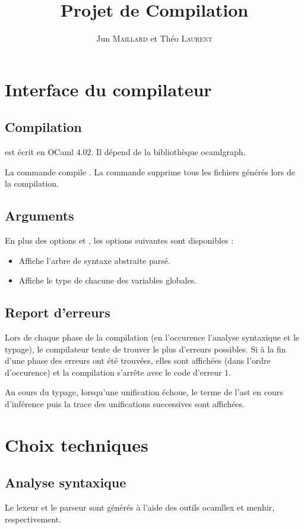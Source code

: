 \documentclass[a4paper]{article}
\title{Projet de Compilation}
\author{Jun \textsc{Maillard} et Théo \textsc{Laurent}}
\begin{document}
\maketitle

\section{Interface du compilateur}

\subsection{Compilation}
 est écrit en OCaml $4.02$. Il dépend de la
bibliothèque ocamlgraph.

La commande  compile .
La commande  supprime tous les fichiers générés lors
de la compilation.

\subsection{Arguments}
En plus des options  et , les
options suivantes sont disponibles :
\begin{itemize}
\item[\PVerb{--print-ast}] Affiche l'arbre de syntaxe abstraite parsé.
\item[\PVerb{--print-type}] Affiche le type de chacune des variables
  globales.
\end{itemize}

\subsection{Report d'erreurs}
Lors de chaque phase de la compilation (en l'occurence l'analyse
syntaxique et le typage), le compilateur tente de trouver le plus
d'erreurs possibles. Si à la fin d'une phase des erreurs ont été
trouvées, elles sont affichées (dans l'ordre d'occurence) et la
compilation s'arrête avec le code d'erreur $1$.

Au cours du typage, lorsqu'une unification échoue, le terme de l'ast
en cours d'inférence puis la trace des unifications successives sont
affichées.

\section{Choix techniques}
\subsection{Analyse syntaxique}
Le lexeur et le parseur sont générés à l'aide des outils ocamllex et
menhir, respectivement.
\end{document}
